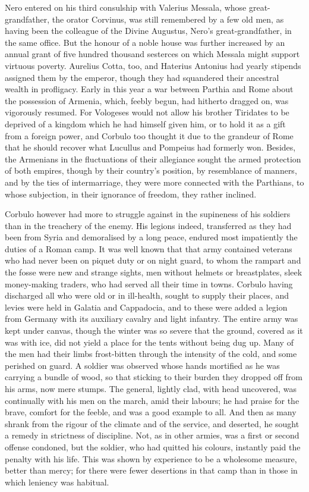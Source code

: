 Nero entered on his third consulship with Valerius Messala, whose great-grandfather, the orator Corvinus, was still remembered by a few old men, as having been the colleague of the Divine Augustus, Nero's great-grandfather, in the same office. But the honour of a noble house was further increased by an annual grant of five hundred thousand sesterces on which Messala might support virtuous poverty. Aurelius Cotta, too, and Haterius Antonius had yearly stipends assigned them by the emperor, though they had squandered their ancestral wealth in profligacy. Early in this year a war between Parthia and Rome about the possession of Armenia, which, feebly begun, had hitherto dragged on, was vigorously resumed. For Vologeses would not allow his brother Tiridates to be deprived of a kingdom which he had himself given him, or to hold it as a gift from a foreign power, and Corbulo too thought it due to the grandeur of Rome that he should recover what Lucullus and Pompeius had formerly won. Besides, the Armenians in the fluctuations of their allegiance sought the armed protection of both empires, though by their country's position, by resemblance of manners, and by the ties of intermarriage, they were more connected with the Parthians, to whose subjection, in their ignorance of freedom, they rather inclined.


Corbulo however had more to struggle against in the supineness of his soldiers than in the treachery of the enemy. His legions indeed, transferred as they had been from Syria and demoralised by a long peace, endured most impatiently the duties of a Roman camp. It was well known that that army contained veterans who had never been on piquet duty or on night guard, to whom the rampart and the fosse were new and strange sights, men without helmets or breastplates, sleek money-making traders, who had served all their time in towns. Corbulo having discharged all who were old or in ill-health, sought to supply their places, and levies were held in Galatia and Cappadocia, and to these were added a legion from Germany with its auxiliary cavalry and light infantry. The entire army was kept under canvas, though the winter was so severe that the ground, covered as it was with ice, did not yield a place for the tents without being dug up. Many of the men had their limbs frost-bitten through the intensity of the cold, and some perished on guard. A soldier was observed whose hands mortified as he was carrying a bundle of wood, so that sticking to their burden they dropped off from his arms, now mere stumps. The general, lightly clad, with head uncovered, was continually with his men on the march, amid their labours; he had praise for the brave, comfort for the feeble, and was a good example to all. And then as many shrank from the rigour of the climate and of the service, and deserted, he sought a remedy in strictness of discipline. Not, as in other armies, was a first or second offense condoned, but the soldier, who had quitted his colours, instantly paid the penalty with his life. This was shown by experience to be a wholesome measure, better than mercy; for there were fewer desertions in that camp than in those in which leniency was habitual.

